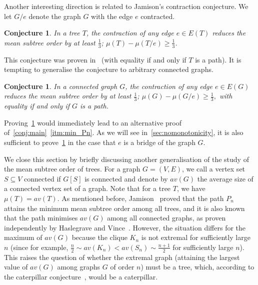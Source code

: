 \documentclass[11pt]{article}
\newtheorem{conj}[thr]{Conjecture}
\theoremstyle{definition}
\newcommand*{\av}{av}
\begin{document}
Another interesting direction is related to Jamison's contraction conjecture. We let $G/e$ denote the graph $G$ with the edge $e$ contracted.
\begin{conj}\cite[Conj.~5.6]{jamison_monotonicity_1984}\label{conj:contractionTrees}
 In a tree $T$, the contraction of any edge $e \in E(T)$ reduces the mean subtree order by at least $\frac 13$; $\mu(T)-\mu(T /e) \ge \frac 13$.
\end{conj}

This conjecture was proven in~\cite{LXWW23, Ruoyu24} (with equality if and only if $T$ is a path). It is tempting to generalise the conjecture to arbitrary connected graphs.

\begin{conj}\label{conj:contraction}
 In a connected graph $G$, the contraction of any edge $e \in E(G)$ reduces the mean subtree order by at least $\frac 13$; $\mu(G)-\mu(G /e) \ge \frac 13,$ with equality if and only if $G$ is a path.
\end{conj}

Proving~\cref{conj:contraction} would immediately lead to an alternative proof of~\cref{conj:main}~\ref{itm:min_Pn}. As we will see in~\cref{sec:nomonotonicity}, it is also sufficient to prove~\cref{conj:contraction} in the case that $e$ is a bridge of the graph $G.$



We close this section by briefly discussing another generalisation of the study of the mean subtree order of trees. For a graph $G=(V,E)$, we call a vertex set $S \subseteq V$ connected if $G[S]$ is connected and denote by $\av(G)$ the average size of a connected vertex set of a graph. Note that for a tree $T$, we have $\mu(T)=\av(T)$. As mentioned before, Jamison~\cite{jamison_average_1983} proved that the path $P_n$ attains the minimum mean subtree order among all trees, and it is also known that the path minimises $\av(G)$ among all connected graphs, as proven independently by Haslegrave and Vince~\cite{John22,Vince22}. However, the situation differs for the maximum of $\av(G)$ because the clique $K_n$ is not extremal for sufficiently large $n$ (since for example, $\frac{n}{2} \sim \av(K_n) < \av(S_n) \sim \frac{n+1}{2}$ for sufficiently large $n$). This raises the question of whether the extremal graph (attaining the largest value of $\av(G)$ among graphs $G$ of order $n$) must be a tree, which, according to the caterpillar conjecture~\cite[Prob.~(7.1)]{jamison_average_1983}, would be a caterpillar.
\end{document}
